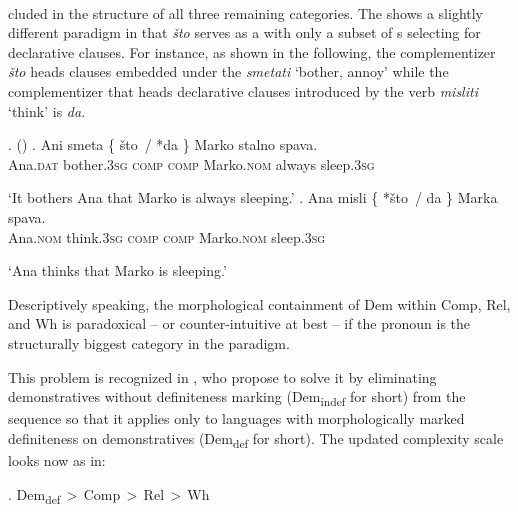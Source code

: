 \noindent 
{}\\
cluded in the structure of all three remaining categories. The  shows a slightly different paradigm in that \textit{\v{s}to} serves as a  with only a subset of s selecting for declarative clauses. For instance, as shown in the following, the complementizer \textit{\v{s}to} heads clauses embedded under the  \textit{smetati} `bother, annoy' while the complementizer that heads declarative clauses introduced by the verb \textit{misliti} `think' is \textit{da}.

\ex.  (\citealt[114]{Mihalicek})
\ag. Ani smeta \{ {\v{s}to \,/} {*da \}} Marko stalno spava.\\
Ana.\textsc{dat} bother.\textsc{3sg} {} {\textsc{comp}} {\textsc{\phantom{l}comp}}  Marko.\textsc{nom} always sleep.\textsc{3sg}\\
\strut `It bothers Ana that Marko is always sleeping.' 
\bg. Ana misli \{ {*\v{s}to \,/} {da \}} Marka spava.\\
Ana.\textsc{nom} think.\textsc{3sg} {} {\phantom{l}\textsc{comp}} {\textsc{comp}}  Marko.\textsc{nom} sleep.\textsc{3sg}\\
\strut `Ana thinks that Marko is sleeping.'

\noindent Descriptively speaking, the morphological containment of Dem within Comp, Rel, and Wh is paradoxical -- or counter-intuitive at best -- if the  pronoun is the structurally biggest category in the paradigm.\largerpage[2]
\par
This problem is recognized in \cite{BaunazLander2018}, who propose to solve it by eliminating demonstratives without definiteness marking (Dem\textsubscript{indef} for short) from the sequence so that it applies only to languages with morphologically marked definiteness on demonstratives (Dem\textsubscript{def} for short). The updated complexity scale looks now as in:

\ex.\label{dem-def} Dem\textsubscript{def}\,$>$\,Comp\,$>$\,Rel\,$>$\,Wh

